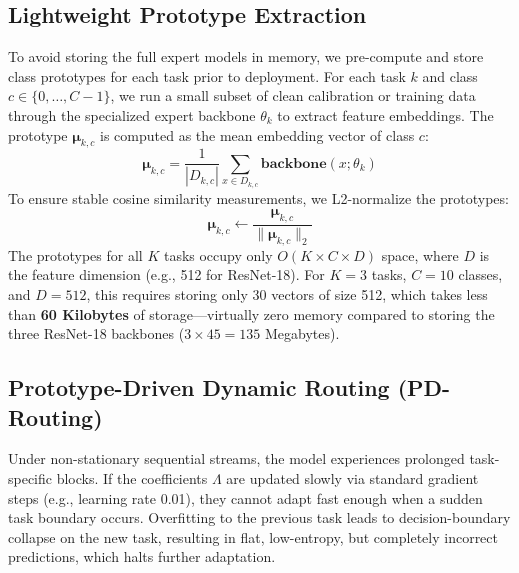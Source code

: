 \documentclass{article}
\theoremstyle{plain}
\theoremstyle{definition}
\theoremstyle{remark}
\begin{document}
\subsection{Lightweight Prototype Extraction}
To avoid storing the full expert models in memory, we pre-compute and store class prototypes for each task prior to deployment. For each task $k$ and class $c \in \{0, \dots, C-1\}$, we run a small subset of clean calibration or training data through the specialized expert backbone $\theta_k$ to extract feature embeddings. The prototype $\mathbf{\mu}_{k, c}$ is computed as the mean embedding vector of class $c$:
\begin{equation}
    \mathbf{\mu}_{k, c} = \frac{1}{|D_{k, c}|} \sum_{x \in D_{k, c}} \mathbf{backbone}(x; \theta_k)
\end{equation}
To ensure stable cosine similarity measurements, we L2-normalize the prototypes:
\begin{equation}
    \mathbf{\mu}_{k, c} \leftarrow \frac{\mathbf{\mu}_{k, c}}{\|\mathbf{\mu}_{k, c}\|_2}
\end{equation}
The prototypes for all $K$ tasks occupy only $O(K \times C \times D)$ space, where $D$ is the feature dimension (e.g., 512 for ResNet-18). For $K=3$ tasks, $C=10$ classes, and $D=512$, this requires storing only 30 vectors of size 512, which takes less than \textbf{60 Kilobytes} of storage---virtually zero memory compared to storing the three ResNet-18 backbones ($3 \times 45 = 135$ Megabytes).

\subsection{Prototype-Driven Dynamic Routing (PD-Routing)}
Under non-stationary sequential streams, the model experiences prolonged task-specific blocks. If the coefficients $\Lambda$ are updated slowly via standard gradient steps (e.g., learning rate 0.01), they cannot adapt fast enough when a sudden task boundary occurs. Overfitting to the previous task leads to decision-boundary collapse on the new task, resulting in flat, low-entropy, but completely incorrect predictions, which halts further adaptation.
\end{document}
